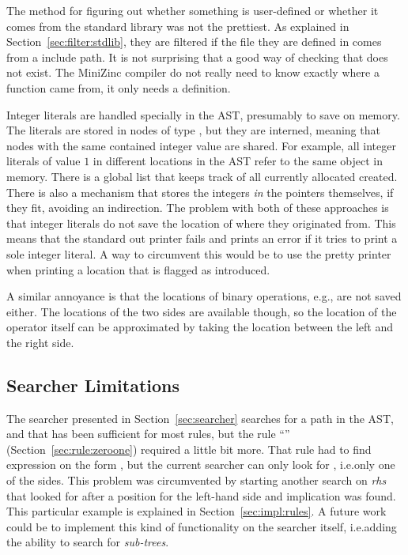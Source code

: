 \documentclass[a4paper,12pt]{article}
\newcommand{\mi}[1]{\mbox{\mzninline{#1}}}
\newcommand{\ruleref}[1]{``\nameref{sec:rule:#1}'' (Section~\ref{sec:rule:#1})}
\begin{document}
The method for figuring out whether something is user-defined or whether it comes from the
standard library was not the prettiest. As explained in Section~\ref{sec:filter:stdlib},
they are filtered if the file they are defined in comes from a include path. It is not
surprising that a good way of checking that does not exist. The MiniZinc compiler do not
really need to know exactly where a function came from, it only needs a definition.

Integer literals are handled specially in the AST, presumably to save on memory. The
literals are stored in nodes of type \mi{IntLit}, but they are interned, meaning that
nodes with the same contained integer value are shared. For example, all integer literals
of value $1$ in different locations in the AST refer to the same object in memory. There
is a global list that keeps track of all currently allocated \mi{IntLit} created. There is
also a mechanism that stores the integers \emph{in} the pointers themselves, if they fit,
avoiding an indirection. The problem with both of these approaches is that integer
literals do not save the location of where they originated from. This means that the
standard out printer fails and prints an error if it tries to print a sole integer
literal. A way to circumvent this would be to use the pretty printer when printing a
location that is flagged as introduced.

A similar annoyance is that the locations of binary operations, e.g.\@ \mi{/\\}, are not
saved either. The locations of the two sides are available though, so the location of the
operator itself can be approximated by taking the location between the left and the right
side.

\subsection{Searcher Limitations}
The searcher presented in Section~\ref{sec:searcher} searches for a path in the AST, and that
has been sufficient for most rules, but the rule \ruleref{zeroone} required a little bit
more. That rule had to find expression on the form \mi{a=1 -> b=1}, but the current
searcher can only look for \mi{a=1 -> rhs}, i.e.\@ only one of the sides. This problem was
circumvented by starting another search on \textit{rhs} that looked for \mi{b=1} after a
position for the left-hand side and implication was found. This particular example is
explained in Section~\ref{sec:impl:rules}. A future work could be to
implement this kind of functionality on the searcher itself, i.e.\@ adding the
ability to search for \emph{sub-trees}.
\end{document}
